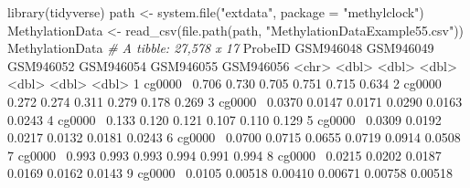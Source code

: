 \documentclass[]{article}
\newcommand{\hlnum}[1]{\textcolor[rgb]{0.816,0.125,0.439}{#1}}%
\newcommand{\hlstr}[1]{\textcolor[rgb]{0.251,0.627,0.251}{#1}}%
\newcommand{\hlcom}[1]{\textcolor[rgb]{0.502,0.502,0.502}{\textit{#1}}}%
\newcommand{\hlopt}[1]{\textcolor[rgb]{0,0,0}{#1}}%
\newcommand{\hlstd}[1]{\textcolor[rgb]{0.251,0.251,0.251}{#1}}%
\newcommand{\hlkwc}[1]{\textcolor[rgb]{0.251,0.251,0.251}{#1}}%
\newcommand{\hlkwd}[1]{\textcolor[rgb]{0.878,0.439,0.125}{#1}}%
\newenvironment{Shaded}{\begin{myshaded}}{\end{myshaded}}
\newcommand{\KeywordTok}[1]{\hlkwd{#1}}
\newcommand{\DataTypeTok}[1]{\hlkwc{#1}}
\newcommand{\DecValTok}[1]{\hlnum{#1}}
\newcommand{\FloatTok}[1]{\hlnum{#1}}
\newcommand{\StringTok}[1]{\hlstr{#1}}
\newcommand{\CommentTok}[1]{\hlcom{#1}}
\newcommand{\OperatorTok}[1]{\hlopt{#1}}
\newcommand{\ErrorTok}[1]{\textcolor{errorcolor}{#1}}
\newcommand{\NormalTok}[1]{\hlstd{#1}}
\begin{document}
\begin{Shaded}
\begin{Highlighting}[]
\KeywordTok{library}\NormalTok{(tidyverse)}
\NormalTok{path <-}\StringTok{ }\KeywordTok{system.file}\NormalTok{(}\StringTok{"extdata"}\NormalTok{, }\DataTypeTok{package =} \StringTok{"methylclock"}\NormalTok{)}
\NormalTok{MethylationData <-}\StringTok{ }\KeywordTok{read_csv}\NormalTok{(}\KeywordTok{file.path}\NormalTok{(path, }\StringTok{"MethylationDataExample55.csv"}\NormalTok{))}
\NormalTok{MethylationData}
  \CommentTok{# A tibble: 27,578 x 17}
\NormalTok{     ProbeID GSM946048 GSM946049 GSM946052 GSM946054 GSM946055 GSM946056}
     \OperatorTok{<}\NormalTok{chr}\OperatorTok{>}\StringTok{       }\ErrorTok{<}\NormalTok{dbl}\OperatorTok{>}\StringTok{     }\ErrorTok{<}\NormalTok{dbl}\OperatorTok{>}\StringTok{     }\ErrorTok{<}\NormalTok{dbl}\OperatorTok{>}\StringTok{     }\ErrorTok{<}\NormalTok{dbl}\OperatorTok{>}\StringTok{     }\ErrorTok{<}\NormalTok{dbl}\OperatorTok{>}\StringTok{     }\ErrorTok{<}\NormalTok{dbl}\OperatorTok{>}
\StringTok{   }\DecValTok{1}\NormalTok{ cg0000}\OperatorTok{~}\StringTok{    }\FloatTok{0.706}    \FloatTok{0.730}     \FloatTok{0.705}     \FloatTok{0.751}     \FloatTok{0.715}     \FloatTok{0.634}  
   \DecValTok{2}\NormalTok{ cg0000}\OperatorTok{~}\StringTok{    }\FloatTok{0.272}    \FloatTok{0.274}     \FloatTok{0.311}     \FloatTok{0.279}     \FloatTok{0.178}     \FloatTok{0.269}  
   \DecValTok{3}\NormalTok{ cg0000}\OperatorTok{~}\StringTok{    }\FloatTok{0.0370}   \FloatTok{0.0147}    \FloatTok{0.0171}    \FloatTok{0.0290}    \FloatTok{0.0163}    \FloatTok{0.0243} 
   \DecValTok{4}\NormalTok{ cg0000}\OperatorTok{~}\StringTok{    }\FloatTok{0.133}    \FloatTok{0.120}     \FloatTok{0.121}     \FloatTok{0.107}     \FloatTok{0.110}     \FloatTok{0.129}  
   \DecValTok{5}\NormalTok{ cg0000}\OperatorTok{~}\StringTok{    }\FloatTok{0.0309}   \FloatTok{0.0192}    \FloatTok{0.0217}    \FloatTok{0.0132}    \FloatTok{0.0181}    \FloatTok{0.0243} 
   \DecValTok{6}\NormalTok{ cg0000}\OperatorTok{~}\StringTok{    }\FloatTok{0.0700}   \FloatTok{0.0715}    \FloatTok{0.0655}    \FloatTok{0.0719}    \FloatTok{0.0914}    \FloatTok{0.0508} 
   \DecValTok{7}\NormalTok{ cg0000}\OperatorTok{~}\StringTok{    }\FloatTok{0.993}    \FloatTok{0.993}     \FloatTok{0.993}     \FloatTok{0.994}     \FloatTok{0.991}     \FloatTok{0.994}  
   \DecValTok{8}\NormalTok{ cg0000}\OperatorTok{~}\StringTok{    }\FloatTok{0.0215}   \FloatTok{0.0202}    \FloatTok{0.0187}    \FloatTok{0.0169}    \FloatTok{0.0162}    \FloatTok{0.0143} 
   \DecValTok{9}\NormalTok{ cg0000}\OperatorTok{~}\StringTok{    }\FloatTok{0.0105}   \FloatTok{0.00518}   \FloatTok{0.00410}   \FloatTok{0.00671}   \FloatTok{0.00758}   \FloatTok{0.00518}

\end{Highlighting}
\end{Shaded}
\end{document}
